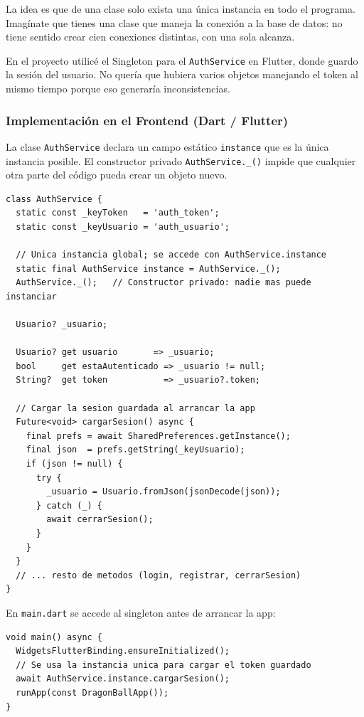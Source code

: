 \documentclass{article}
\begin{document}
La idea es que de una clase solo exista una \'unica instancia en todo el
programa. Imag\'inate que tienes una clase que maneja la conexi\'on a la base
de datos: no tiene sentido crear cien conexiones distintas, con una sola
alcanza.
 
En el proyecto utilic\'e el Singleton para el \texttt{AuthService} en Flutter,
donde guardo la sesi\'on del usuario. No quer\'ia que hubiera varios objetos
manejando el token al mismo tiempo porque eso generar\'ia inconsistencias.
 
\subsubsection*{Implementaci\'on en el Frontend (Dart / Flutter)}
 
La clase \texttt{AuthService} declara un campo est\'atico \texttt{instance}
que es la \'unica instancia posible. El constructor privado \texttt{AuthService.\_()}
impide que cualquier otra parte del c\'odigo pueda crear un objeto nuevo.
 
\begin{lstlisting}[style=dartStyle, caption={AuthService -- patr\'on Singleton (lib/services/auth\_service.dart)}]
class AuthService {
  static const _keyToken   = 'auth_token';
  static const _keyUsuario = 'auth_usuario';
 
  // Unica instancia global; se accede con AuthService.instance
  static final AuthService instance = AuthService._();
  AuthService._();   // Constructor privado: nadie mas puede instanciar
 
  Usuario? _usuario;
 
  Usuario? get usuario       => _usuario;
  bool     get estaAutenticado => _usuario != null;
  String?  get token           => _usuario?.token;
 
  // Cargar la sesion guardada al arrancar la app
  Future<void> cargarSesion() async {
    final prefs = await SharedPreferences.getInstance();
    final json  = prefs.getString(_keyUsuario);
    if (json != null) {
      try {
        _usuario = Usuario.fromJson(jsonDecode(json));
      } catch (_) {
        await cerrarSesion();
      }
    }
  }
  // ... resto de metodos (login, registrar, cerrarSesion)
}
\end{lstlisting}
 
En \texttt{main.dart} se accede al singleton antes de arrancar la app:
 
\begin{lstlisting}[style=dartStyle, caption={Uso del Singleton en main.dart}]
void main() async {
  WidgetsFlutterBinding.ensureInitialized();
  // Se usa la instancia unica para cargar el token guardado
  await AuthService.instance.cargarSesion();
  runApp(const DragonBallApp());
}
\end{lstlisting}
 
\end{document}
